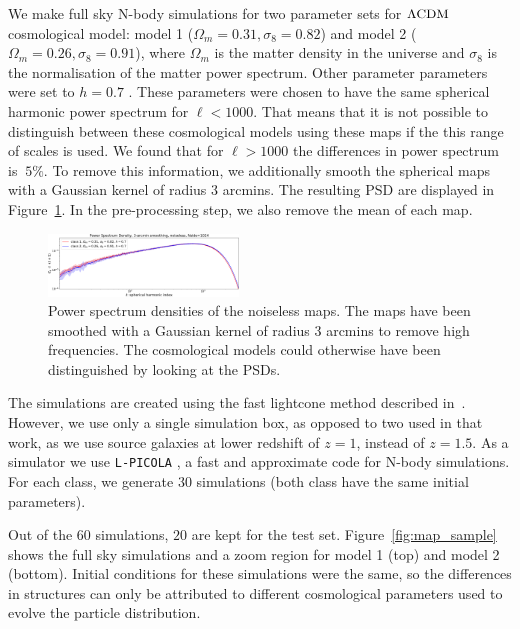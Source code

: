 \documentclass[final,twocolumn,3p,times,authoryear]{elsarticle}
\newcommand{\todo}[1]{{\color[rgb]{.6,.1,.6}{#1}}}
\newcommand{\figref}[1]{Figure~\ref{fig:#1}}
\newcommand{\1}{\b{1}}              %
\newcommand{\0}{\b{0}}              %
\newcommand{\pkg}[1]{\texttt{#1}}
\begin{document}
We make full sky N-body simulations for two parameter sets for $\Lambda \rm{CDM} $ cosmological model: model 1 ($\Omega_m=0.31, \sigma_8=0.82$) and model 2 ($\Omega_m=0.26, \sigma_8=0.91$), where $\Omega_m$ is the matter density in the universe and $\sigma_8$ is the normalisation of the matter power spectrum.
Other parameter parameters were set to $h=0.7$ \todo{(MORE PARAMS HERE - CHECK WITH RAPHAEL)}.
These parameters were chosen to have the same spherical harmonic power spectrum for $\ell<1000$.
That means that it is not possible to distinguish between these cosmological models using these maps if the this range of scales is used.
We found that for $\ell>1000$ the differences in power spectrum is $~5\%$.
To remove this information, we additionally smooth the spherical maps with a Gaussian kernel of radius $3$ arcmins. The resulting PSD are displayed in \figref{psd_sigma3}. In the pre-processing step, we also remove the mean of each map.

\begin{figure}[!ht]
\centering
\includegraphics[width=0.45\textwidth]{figures/psd_sigma3.pdf}
\caption{Power spectrum densities of the noiseless maps. The maps have been smoothed with a Gaussian kernel of radius $3$ arcmins to remove high frequencies. The cosmological models could otherwise have been distinguished by looking at the PSDs.}
\label{fig:psd_sigma3}
\end{figure}

The simulations are created using the fast lightcone method described in~\citep{sgier2018fastgeneration}.
However, we use only a single simulation box, as opposed to two used in that work, as we use source galaxies at lower redshift of $z=1$, instead of $z=1.5$.
As a simulator we use \pkg{L-PICOLA} \citep{howlett2015lpicola}, a fast and approximate code for N-body simulations.
For each class, we generate $30$ simulations (both class have the same initial parameters).

Out of the $60$ simulations, $20$ are kept for the test set.
\figref{map_sample} shows the full sky simulations and a zoom region for model 1 (top) and model 2 (bottom).
Initial conditions for these simulations were the same, so the differences in structures can only be attributed to different cosmological parameters used to evolve the particle distribution.
\end{document}
